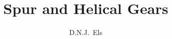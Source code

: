 \documentclass[14pt,afrikaans,english]{memoir}
\title{\bfseries Spur and Helical Gears}
\author{D.N.J.\ Els}
       {D.N.J.\ Els\\[.5ex] \large\texttt{(dnjels@sun.ac.za)}}
\begin{document}
\frontmatter
\TitlePage
\end{document}
